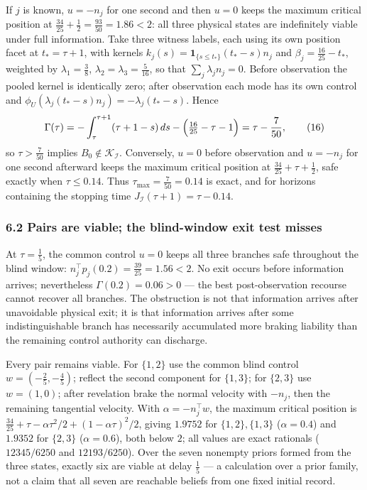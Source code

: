 \documentclass[10pt,twocolumn]{article}
\theoremstyle{definition}
\begin{document}
If \(j\) is known, \(u = -n_j\) for one second and then \(u = 0\) keeps the
maximum critical position at \(\tfrac{34}{25} + \tfrac12 = \tfrac{93}{50} =
1.86 < 2\): all three physical states are indefinitely viable under full
information. Take three witness labels, each using its own position facet at
\(t_* = \tau + 1\), with kernels \(k_j(s) = \mathbf{1}_{\{s \le t_*\}} (t_* -
s) n_j\) and \(\beta_j = \tfrac{16}{25} - t_*\), weighted by
\(\lambda_1 = \tfrac38\), \(\lambda_2 = \lambda_3 = \tfrac{5}{16}\), so that
\(\sum_j \lambda_j n_j = 0\). Before observation the pooled kernel is
identically zero; after observation each mode has its own control and
\(\phi_U(\lambda_j (t_* - s) n_j) = -\lambda_j (t_* - s)\). Hence
\[
\Gamma(\tau) = -\int_\tau^{\tau+1} (\tau + 1 - s)\, ds
- \Bigl(\tfrac{16}{25} - \tau - 1\Bigr) = \tau - \frac{7}{50},
\tag{16}
\]
so \(\tau > \tfrac{7}{50}\) implies \(B_0 \notin \mathcal{K}_{\mathcal{I}}\).
Conversely, \(u = 0\) before observation and \(u = -n_j\) for one second
afterward keeps the maximum critical position at \(\tfrac{34}{25} + \tau +
\tfrac12\), safe exactly when \(\tau \le 0.14\). Thus \(\tau_{\max} =
\tfrac{7}{50} = 0.14\) is exact, and for horizons containing the stopping
time \(J_{\mathcal{I}}(\tau + 1) = \tau - 0.14\).

\subsubsection{6.2 Pairs are viable; the blind-window exit test misses}\label{pairs}

At \(\tau = \tfrac15\), the common control \(u = 0\) keeps all three branches
safe throughout the blind window: \(n_j^\top p_j(0.2) = \tfrac{39}{25} = 1.56
< 2\). No exit occurs before information arrives; nevertheless
\(\Gamma(0.2) = 0.06 > 0\) --- the best post-observation recourse cannot
recover all branches. The obstruction is not that information arrives after
unavoidable physical exit; it is that information arrives after some
indistinguishable branch has necessarily accumulated more braking liability
than the remaining control authority can discharge.

Every pair remains viable. For \(\{1,2\}\) use the common blind control
\(w = (-\tfrac25, -\tfrac45)\); reflect the second component for \(\{1,3\}\);
for \(\{2,3\}\) use \(w = (1,0)\); after revelation brake the normal velocity
with \(-n_j\), then the remaining tangential velocity. With \(\alpha = -n_j
^\top w\), the maximum critical position is \(\tfrac{34}{25} + \tau -
\alpha\tau^2/2 + (1 - \alpha\tau)^2/2\), giving \(1.9752\) for
\(\{1,2\},\{1,3\}\) (\(\alpha = 0.4\)) and \(1.9352\) for \(\{2,3\}\)
(\(\alpha = 0.6\)), both below \(2\); all values are exact rationals
(\(12345/6250\) and \(12193/6250\)). Over the seven nonempty priors formed
from the three states, exactly six are viable at delay \(\tfrac15\) --- a
calculation over a prior family, not a claim that all seven are reachable
beliefs from one fixed initial record.
\end{document}
